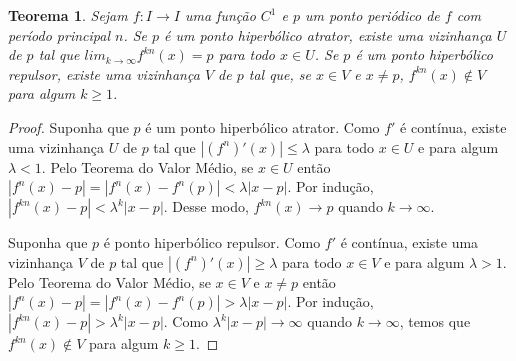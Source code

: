 \documentclass[a4paper, 12pt]{article}
\newtheorem{theorem}[definition]{Teorema}
\begin{document}
\begin{theorem}
Sejam $f: I \rightarrow I$ uma função $C^1$ e $p$ um ponto periódico de $f$ com período principal $n$. Se $p$ é um ponto hiperbólico atrator, existe uma vizinhança $U$ de $p$ tal que $lim_{k \rightarrow \infty} f^{kn}(x) = p$ para todo $x \in U$. Se $p$ é um ponto hiperbólico repulsor, existe uma vizinhança $V$ de $p$ tal que, se $x \in V$ e $x \neq p$, $f^{kn}(x) \notin V$ para algum $k \geq 1$. 
\end{theorem}

\begin{proof}
Suponha que $p$ é um ponto hiperbólico atrator. Como $f'$ é contínua, existe uma vizinhança $U$ de $p$ tal que $|(f^n)'(x)| \leq \lambda$ para todo $x \in U$ e para algum $\lambda < 1$. Pelo Teorema do Valor Médio, se $x \in U$ então $|f^n(x) - p| = |f^n(x) - f^n(p)| < \lambda|x - p|$. Por indução, $|f^{kn}(x) - p| < \lambda^k|x - p|$. Desse modo, $f^{kn}(x) \rightarrow p$ quando $k \rightarrow \infty$.

Suponha que $p$ é ponto hiperbólico repulsor. Como $f'$ é contínua, existe uma vizinhança $V$ de $p$ tal que $|(f^n)'(x)| \geq \lambda$ para todo $x \in V$ e para algum $\lambda > 1$. Pelo Teorema do Valor Médio, se $x \in V$ e $x \neq p$ então $|f^n(x) - p| = |f^n(x) - f^n(p)| > \lambda|x - p|$. Por indução, $|f^{kn}(x) - p| > \lambda^k|x - p|$. Como $\lambda^k|x - p| \rightarrow \infty$ quando $k \rightarrow \infty$, temos que  $f^{kn}(x) \notin V$ para algum $k \geq 1$. 
\end{proof}
\end{document}
